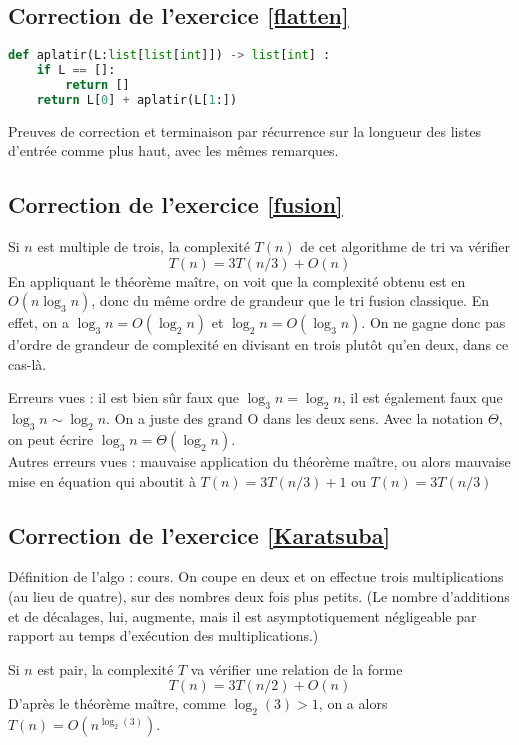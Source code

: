 \documentclass[11pt,a4paper]{article}
\begin{document}
\subsection*{Correction de l'exercice \ref{flatten}}

\begin{lstlisting}[language=Python]
def aplatir(L:list[list[int]]) -> list[int] :
	if L == []:
		return []
	return L[0] + aplatir(L[1:])
\end{lstlisting}

Preuves de correction et terminaison par récurrence sur la longueur des listes d'entrée comme plus haut, avec les mêmes remarques.

\subsection*{Correction de l'exercice \ref{fusion}}

Si $n$ est multiple de trois, la complexité $T(n)$ de cet algorithme de tri va vérifier
\[ T(n) = 3T(n/3)+O(n)\]
En appliquant le théorème maître, on voit que la complexité obtenu est  en $O(n\log_3 n)$, donc du même ordre de grandeur que le tri fusion classique. En effet, on a $\log_3 n = O(\log_2 n)$ et $\log_2 n = O(\log_3 n)$.
On ne gagne donc pas d'ordre de grandeur de complexité en divisant en trois plutôt qu'en deux, dans ce cas-là.

Erreurs vues : il est bien sûr faux que $\log_3 n = \log_2 n$, il est également faux que $\log_3 n \sim \log_2 n$. On a juste des grand O dans les deux sens. Avec la notation $\Theta$, on peut écrire $\log_3 n = \Theta(\log_2 n)$.\\
Autres erreurs vues : mauvaise application du théorème maître, ou alors  mauvaise mise en équation qui aboutit à $T(n) = 3T(n/3)+1$ ou $T(n) = 3T(n/3)$

\subsection*{Correction de l'exercice \ref{Karatsuba}}

Définition de l'algo : cours. On coupe en deux et on effectue trois multiplications (au lieu de quatre), sur des nombres deux fois plus petits. (Le nombre d'additions et de décalages, lui, augmente, mais il est asymptotiquement négligeable par rapport au temps d'exécution des multiplications.)

Si $n$ est pair, la complexité $T$ va vérifier une relation de la forme
\[ T(n) = 3T(n/2)+O(n)\]
D'après le théorème maître, comme $\log_2(3)>1$, on a alors $T(n) = O\left(n^{\log_2(3)}\right)$.
\end{document}
